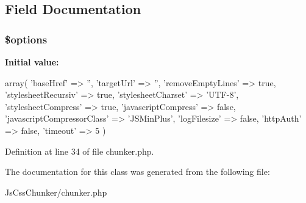 \subsection{Field Documentation}
\hypertarget{class_js_css_chunker_a011800c63ece4cbbfa77136a20607023}{
\subsubsection[{\$options}]{\setlength{\rightskip}{0pt plus 5cm}\$options}}
\label{class_js_css_chunker_a011800c63ece4cbbfa77136a20607023}
{\bfseries Initial value:}
\begin{DoxyCode}
 array(
    'baseHref' => '',
    'targetUrl' => '',
    'removeEmptyLines' => true,
    'stylesheetRecursiv' => true,
    'stylesheetCharset' => 'UTF-8',
    'stylesheetCompress' => true,
    'javascriptCompress' => false,
    'javascriptCompressorClass' => 'JSMinPlus',
    'logFilesize' => false,
    'httpAuth' => false,
    'timeout' => 5
  )
\end{DoxyCode}


Definition at line 34 of file chunker.php.



The documentation for this class was generated from the following file:\begin{DoxyCompactItemize}
\item 
JsCssChunker/chunker.php\end{DoxyCompactItemize}

